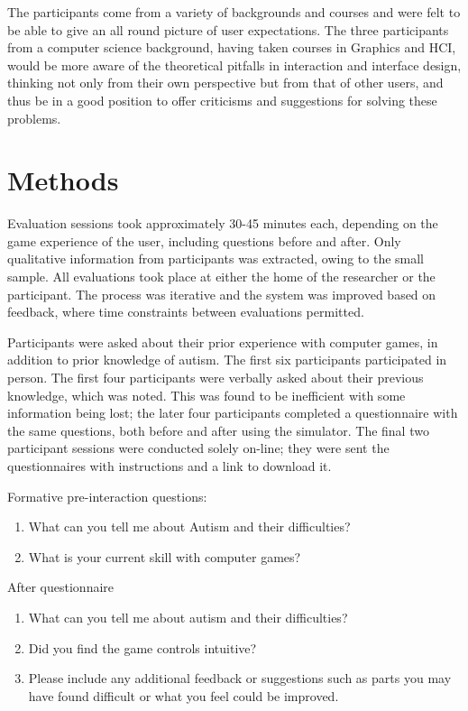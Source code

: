 \documentclass[11pt]{report}
\begin{document}
The participants come from a variety of backgrounds and courses and were felt to be able to give an all round picture of user expectations. The three participants from a computer science background, having taken courses in Graphics and HCI, would be more aware of the theoretical pitfalls in interaction and interface design, thinking not only from their own perspective but from that of other users, and thus be in a good position to offer criticisms and suggestions for solving these problems.

\section{Methods}

Evaluation sessions took approximately 30-45 minutes each, depending on the game experience of the user, including questions before and after. Only qualitative information from participants was extracted, owing to the small sample. All evaluations took place at either the home of the researcher or the participant. The process was iterative and the system was improved based on feedback, where time constraints between evaluations permitted.

Participants were asked about their prior experience with computer games, in addition to prior knowledge of autism. The first six participants participated in person. The first four participants were verbally asked about their previous knowledge, which was noted. This was found to be inefficient with some information being lost; the later four participants completed a questionnaire with the same questions, both before and after using the simulator. The final two participant sessions were conducted solely on-line; they were sent the questionnaires with instructions and a link to download it. 

Formative pre-interaction questions:
\begin{enumerate}
\item What can you tell me about Autism and their difficulties?
\item What is your current skill with computer games?
\end{enumerate}

After questionnaire 
\begin{enumerate}
\item What can you tell me about autism and their difficulties?
\item Did you find the game controls intuitive?
\item Please include any additional feedback or suggestions such as parts you may have found difficult or what you feel could be improved.
\end{enumerate}
\end{document}
